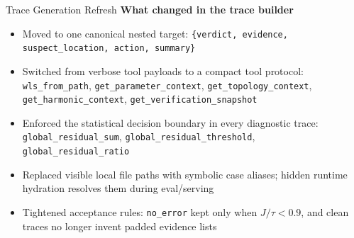 \documentclass{beamer}
\begin{document}
\begin{frame}{Trace Generation Refresh}
  \textbf{What changed in the trace builder}
  \begin{itemize}
    \item Moved to one canonical nested target:
    \texttt{\{verdict, evidence, suspect\_location, action, summary\}}
    \item Switched from verbose tool payloads to a compact tool protocol:
    \texttt{wls\_from\_path}, \texttt{get\_parameter\_context}, \texttt{get\_topology\_context},
    \texttt{get\_harmonic\_context}, \texttt{get\_verification\_snapshot}
    \item Enforced the statistical decision boundary in every diagnostic trace:
    \texttt{global\_residual\_sum}, \texttt{global\_residual\_threshold}, \texttt{global\_residual\_ratio}
    \item Replaced visible local file paths with symbolic case aliases; hidden runtime hydration resolves them during eval/serving
    \item Tightened acceptance rules:
    \texttt{no\_error} kept only when $J / \tau < 0.9$, and clean traces no longer invent padded evidence lists
  \end{itemize}
\end{frame}
\end{document}
